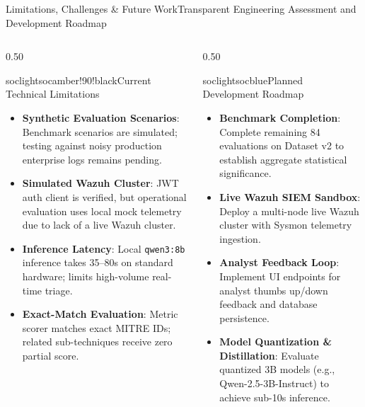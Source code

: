 \documentclass[aspectratio=169, 10pt]{beamer}
\begin{document}
\begin{frame}{Limitations, Challenges \& Future Work}{Transparent Engineering Assessment and Development Roadmap}
  \begin{columns}[T]
    \begin{column}{0.50\textwidth}
      \begin{cardbox}{soclight}{socamber!90!black}{Current Technical Limitations}
        \begin{itemize}\setlength{\itemsep}{2pt}
          \item \textbf{Synthetic Evaluation Scenarios}: Benchmark scenarios are simulated; testing against noisy production enterprise logs remains pending.
          \item \textbf{Simulated Wazuh Cluster}: JWT auth client is verified, but operational evaluation uses local mock telemetry due to lack of a live Wazuh cluster.
          \item \textbf{Inference Latency}: Local \texttt{qwen3:8b} inference takes 35--80s on standard hardware; limits high-volume real-time triage.
          \item \textbf{Exact-Match Evaluation}: Metric scorer matches exact MITRE IDs; related sub-techniques receive zero partial score.
        \end{itemize}
      \end{cardbox}
    \end{column}

    \begin{column}{0.50\textwidth}
      \begin{cardbox}{soclight}{socblue}{Planned Development Roadmap}
        \begin{itemize}\setlength{\itemsep}{2pt}
          \item \textbf{Benchmark Completion}: Complete remaining 84 evaluations on Dataset v2 to establish aggregate statistical significance.
          \item \textbf{Live Wazuh SIEM Sandbox}: Deploy a multi-node live Wazuh cluster with Sysmon telemetry ingestion.
          \item \textbf{Analyst Feedback Loop}: Implement UI endpoints for analyst thumbs up/down feedback and database persistence.
          \item \textbf{Model Quantization \& Distillation}: Evaluate quantized 3B models (e.g., Qwen-2.5-3B-Instruct) to achieve sub-10s inference.
        \end{itemize}
      \end{cardbox}
    \end{column}
  \end{columns}
\end{frame}
\end{document}
